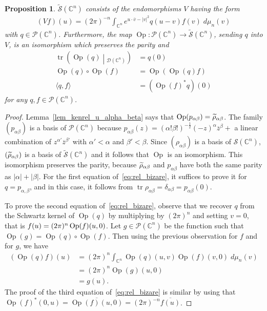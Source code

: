 \documentclass[10pt,a4paper]{article}
\newtheorem{prop}[theo]{Proposition}
\theoremstyle{definition}
\numberwithin{equation}{section}
\newcommand{\C}{{\mathbb{C}}}
\newcommand{\be}{{\beta}}
\newcommand{\al}{{\alpha}}
\newcommand{\con}{\overline}
\newcommand{\op}{\operatorname}
\newcommand{\D}{\mathcal{D}}
\newcommand{\symb}{\mathcal{S}}
\newcommand{\pol}{\mathcal{P}}
\newcommand{\Uu}{\rho}
\newcommand{\Vvv}{\tilde \rho}
\newcommand{\Ppp}{p}
\let\oldtilde\tilde
\renewcommand*{\tilde}[1]{\mathchoice{\widetilde{#1}}{\widetilde{#1}}{\oldtilde{#1}}{\oldtilde{#1}}}
\begin{document}
\begin{prop}\label{prop:tilde_symb_and_op}
$\widetilde{\symb} (\C^n)$ consists of the endomorphisms $V$ having the form
\begin{gather}\label{eq:sch_ker}
(V f)(u) = (2\pi)^{-n} \int_{\C^n} e^{u\cdot \con v - |v|^2} q (u-v) f(v) \; d\mu_n (v)
\end{gather}
with $q \in \pol (\C^n)$. Furthermore, the map $\op{Op} : \pol (\C^n) \rightarrow
\widetilde{\symb} (\C^n)$, sending $q$ into $V$, is an isomorphism which preserves the parity  and
\begin{equation} \label{eq:rel_bizare}
\begin{split}
\op{tr} \left(\op{Op} (q)\middle|_{\D (\C^n)} \right) &= q (0) \\
 \op{Op} (q) \circ \op{Op} (f) &= \op{Op} (\op{Op} (q) f) \\
 \langle q, f \rangle &= \left(\op{Op}(f)^* q\right)(0)
\end{split}
\end{equation}
for any $q, f \in \pol (\C^n)$. 
\end{prop}
\begin{proof}
Lemma~\ref{lem_kenrel_u_alpha_beta} says that $\op{Op} (\Ppp_{\al\be}) =
\Vvv_{\al \be}$. The family $(\Ppp_{\al\be})$ is a basis of $\pol (\C^n)$ because $\Ppp_{\al\be} (z) = (\al ! \be !) ^{-\frac{1}{2}}(- z)^{\al} \con{z}^{\beta} + $ a linear combination of $z^{\al'} \con{z}^{\be'}$ with $\al' < \al$ and $\be' < \be$. Since $(\Uu_{\al\be})$ is a basis of $\symb (\C^n)$, $(\Vvv_{\al \be})$ is a basis of $\widetilde { \symb } (\C^n)$ and it follows that $\op{Op}$ is an isomorphism. This isomorphism preserves the parity, because $\Vvv_{\al
\be} $ and $\Ppp_{\al\be}$ have both the same parity as $|\al| + |\be|$. For the first equation of~\eqref{eq:rel_bizare}, it suffices to prove it for $q = \Ppp_{\al,\be}$, and in this case, it follows from $\op{tr}
\Uu_{\al\be} =\delta_{\al\be} = \Ppp_{\al\be} (0)$.

To prove the second equation of~\eqref{eq:rel_bizare}, observe that we recover $q$ from the Schwartz kernel of $\op{Op} (q)$  by multiplying by $(2\pi)^{n}$ and setting $v = 0 $, that is $ f(u) = (2 \pi)^n \op{Op} (f)\linebreak(u,0)$. Let $g \in \pol (\C^n)$ be the function such that $\op{Op} (g) = \op{Op} (q) \circ \op{Op} (f)$. Then using the previous observation for $f$ and for $g$, we have
\begin{align*}
(\op{Op} (q) f) (u) &=  (2\pi)^n \int_{\C^n} \op{Op}(q) (u,v) \op{Op} (f) (v,0) \; d\mu_n (v) \\
&=  (2 \pi)^n \op{Op}(g) (u,0) \\
&=  g (u).
\end{align*}
The proof of the third equation of~\eqref{eq:rel_bizare} is similar by using that $ \op{Op}(f)^* (0,u) = \con{\op{Op} (f) (u,0)}= (2 \pi)^{-n} \con{f (u)}$.
\end{proof}
\end{document}
